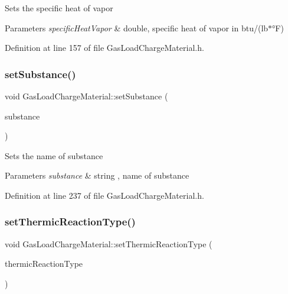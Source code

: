 Sets the specific heat of vapor 
\begin{DoxyParams}{Parameters}
{\em specific\+Heat\+Vapor} & double, specific heat of vapor in btu/(lb$\ast$°F) \\
\hline
\end{DoxyParams}


Definition at line 157 of file Gas\+Load\+Charge\+Material.\+h.

\mbox{\label{class_gas_load_charge_material_a20cc3df601d8daae9b8f8e7b0c53c2e3}} 
\subsubsection{\texorpdfstring{set\+Substance()}{setSubstance()}}
{\footnotesize\ttfamily void Gas\+Load\+Charge\+Material\+::set\+Substance (\begin{DoxyParamCaption}\item[{std\+::string}]{substance }\end{DoxyParamCaption})\hspace{0.3cm}{\ttfamily [inline]}}

Sets the name of substance 
\begin{DoxyParams}{Parameters}
{\em substance} & string , name of substance \\
\hline
\end{DoxyParams}


Definition at line 237 of file Gas\+Load\+Charge\+Material.\+h.

\mbox{\label{class_gas_load_charge_material_ac48eb07a3008f1dc0ff433353b59536d}} 
\subsubsection{\texorpdfstring{set\+Thermic\+Reaction\+Type()}{setThermicReactionType()}}
{\footnotesize\ttfamily void Gas\+Load\+Charge\+Material\+::set\+Thermic\+Reaction\+Type (\begin{DoxyParamCaption}\item[{\hyperlink{class_load_charge_material_a51d4263e865a5d86236622dd3fe23fd1}{Load\+Charge\+Material\+::\+Thermic\+Reaction\+Type}}]{thermic\+Reaction\+Type }\end{DoxyParamCaption})\hspace{0.3cm}{\ttfamily [inline]}}

